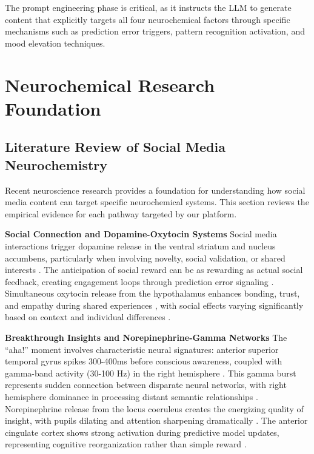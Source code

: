 \documentclass{article}
\begin{document}
The prompt engineering phase is critical, as it instructs the LLM to generate content that explicitly targets all four neurochemical factors through specific mechanisms such as prediction error triggers, pattern recognition activation, and mood elevation techniques.

\section{Neurochemical Research Foundation}

\subsection{Literature Review of Social Media Neurochemistry}

Recent neuroscience research provides a foundation for understanding how social media content can target specific neurochemical systems. This section reviews the empirical evidence for each pathway targeted by our platform.

\textbf{Social Connection and Dopamine-Oxytocin Systems}
Social media interactions trigger dopamine release in the ventral striatum and nucleus accumbens, particularly when involving novelty, social validation, or shared interests \cite{ruff2014neurobiology}. The anticipation of social reward can be as rewarding as actual social feedback, creating engagement loops through prediction error signaling \cite{schultz2016dopamine}. Simultaneous oxytocin release from the hypothalamus enhances bonding, trust, and empathy during shared experiences \cite{carter2014oxytocin}, with social effects varying significantly based on context and individual differences \cite{bartz2011social}.

\textbf{Breakthrough Insights and Norepinephrine-Gamma Networks}
The ``aha!'' moment involves characteristic neural signatures: anterior superior temporal gyrus spikes 300-400ms before conscious awareness, coupled with gamma-band activity (30-100 Hz) in the right hemisphere \cite{kounios2014cognitive, jung2004neural}. This gamma burst represents sudden connection between disparate neural networks, with right hemisphere dominance in processing distant semantic relationships \cite{bowden2003aha}. Norepinephrine release from the locus coeruleus creates the energizing quality of insight, with pupils dilating and attention sharpening dramatically \cite{beversdorf2019neuropsychopharmacological}. The anterior cingulate cortex shows strong activation during predictive model updates, representing cognitive reorganization rather than simple reward \cite{alexander2011medial}.
\end{document}
